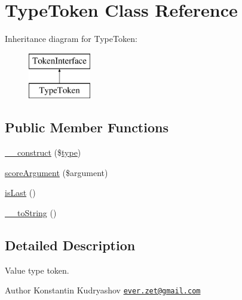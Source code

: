 \hypertarget{class_prophecy_1_1_argument_1_1_token_1_1_type_token}{}\section{Type\+Token Class Reference}
\label{class_prophecy_1_1_argument_1_1_token_1_1_type_token}
Inheritance diagram for Type\+Token\+:\begin{figure}[H]
\begin{center}
\leavevmode
\includegraphics[height=2.000000cm]{class_prophecy_1_1_argument_1_1_token_1_1_type_token}
\end{center}
\end{figure}
\subsection*{Public Member Functions}
\begin{DoxyCompactItemize}
\item 
\mbox{\hyperlink{class_prophecy_1_1_argument_1_1_token_1_1_type_token_ac395571e7767c80119b30cf2e5087c59}{\+\_\+\+\_\+construct}} (\$\mbox{\hyperlink{class_prophecy_1_1_argument_ab1d400a505a0a37507d931b8feba7804}{type}})
\item 
\mbox{\hyperlink{class_prophecy_1_1_argument_1_1_token_1_1_type_token_a8d5bf47ab6eaa935458d5ad160e52822}{score\+Argument}} (\$argument)
\item 
\mbox{\hyperlink{class_prophecy_1_1_argument_1_1_token_1_1_type_token_ac72b8349b1340887fc1af30eca2b951c}{is\+Last}} ()
\item 
\mbox{\hyperlink{class_prophecy_1_1_argument_1_1_token_1_1_type_token_a7516ca30af0db3cdbf9a7739b48ce91d}{\+\_\+\+\_\+to\+String}} ()
\end{DoxyCompactItemize}


\subsection{Detailed Description}
Value type token.

\begin{DoxyAuthor}{Author}
Konstantin Kudryashov \href{mailto:ever.zet@gmail.com}{\tt ever.\+zet@gmail.\+com} 
\end{DoxyAuthor}


